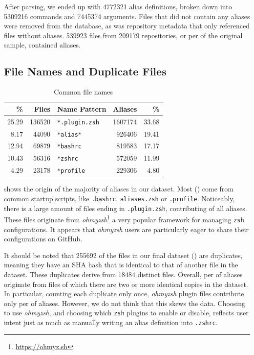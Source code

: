 After parsing, we ended up with \num{4772321} alias definitions, broken down into \num{5309216} commands and \num{7445374} arguments.
Files that did not contain any aliases were removed from the database, as was repository metadata that only referenced files without aliases.
\num{539923} files from \num{209179} repositories, or  per of the original sample, contained aliases.

\subsection{File Names and Duplicate Files}

\begin{table}
    \caption{Common file names}
    \label{tab:file-names}
    \begin{tabular}{rrlrr}
        \toprule
                  \% &          Files &        Name Pattern &         Aliases &           \% \\
        \midrule
         \num{25.29} &  \num{136520}  & \verb|*.plugin.zsh| &  \num{1607174}  &  \num{33.68} \\
          \num{8.17} &   \num{44090}  &      \verb|*alias*| &   \num{926406}  &  \num{19.41} \\
         \num{12.94} &   \num{69879}  &      \verb|*bashrc| &   \num{819583}  &  \num{17.17} \\
         \num{10.43} &   \num{56316}  &       \verb|*zshrc| &   \num{572059}  &  \num{11.99} \\
          \num{4.29} &   \num{23178}  &     \verb|*profile| &   \num{229306}  &   \num{4.80} \\
        \bottomrule
    \end{tabular}
\end{table}

 shows the origin of the majority of aliases in our dataset.
Most () come from common startup scripts, like \texttt{.bashrc}, \texttt{aliases.zsh} or \texttt{.profile}.
Noticeably, there is a large amount of files ending in \texttt{.plugin.zsh}, contributing  of all aliases.
These files originate from \emph{ohmyzsh}\footnote{\url{https://ohmyz.sh}} a very popular framework for managing \texttt{zsh} configurations.
It appears that \emph{ohmyzsh} users are particularly eager to share their configurations on GitHub.

It should be noted that \num{255692} of the files in our final dataset () are duplicates, meaning they have an SHA hash that is identical to that of another file in the dataset.
These duplicates derive from \num{18484} distinct files.
Overall,  per of aliases originate from files of which there are two or more identical copies in the dataset.
In particular, counting each duplicate only once, \emph{ohmyzsh} plugin files contribute only  per of aliases.
However, we do not think that this skews the data.
Choosing to use \emph{ohmyzsh}, and choosing which \texttt{zsh} plugins to enable or disable, reflects user intent just as much as manually writing an alias definition into \texttt{.zshrc}.

